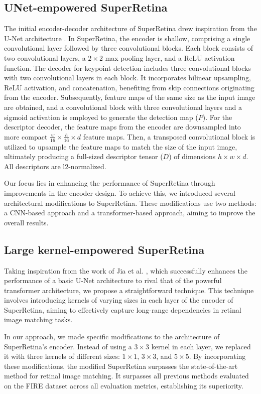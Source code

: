 \documentclass[10pt,twocolumn,letterpaper]{article}
\begin{document}
\subsection{UNet-empowered SuperRetina}
The initial encoder-decoder architecture of SuperRetina drew inspiration from the U-Net architecture \cite{ronneberger2015u}. In SuperRetina, the encoder is shallow, comprising a single convolutional layer followed by three convolutional blocks. Each block consists of two convolutional layers, a $2 \times 2$ max pooling layer, and a ReLU activation function. The decoder for keypoint detection includes three convolutional blocks with two convolutional layers in each block. It incorporates bilinear upsampling, ReLU activation, and concatenation, benefiting from skip connections originating from the encoder. Subsequently, feature maps of the same size as the input image are obtained, and a convolutional block with three convolutional layers and a sigmoid activation is employed to generate the detection map ($P$). 
For the descriptor decoder, the feature maps from the encoder are downsampled into more compact $\frac{w}{16} \times \frac{h}{16} \times d$ feature maps. Then, a transposed convolutional block is utilized to upsample the feature maps to match the size of the input image, ultimately producing a full-sized descriptor tensor ($D$) of dimensions $h \times w \times d$. All descriptors are l2-normalized.

Our focus lies in enhancing the performance of SuperRetina through improvements in the encoder design. To achieve this, we introduced several architectural modifications to SuperRetina. These modifications use two methods: a CNN-based approach and a transformer-based approach, aiming to improve the overall results.

\subsection{Large kernel-empowered SuperRetina}
Taking inspiration from the work of Jia et al. \cite{jia2022u}, which successfully enhances the performance of a basic U-Net architecture to rival that of the powerful transformer architecture, we propose a straightforward technique. This technique involves introducing kernels of varying sizes in each layer of the encoder of SuperRetina, aiming to effectively capture long-range dependencies in retinal image matching tasks.

In our approach, we made specific modifications to the architecture of SuperRetina's encoder. Instead of using a $3 \times 3$ kernel in each layer, we replaced it with three kernels of different sizes: $1 \times 1$, $3 \times 3$, and $5 \times 5$. By incorporating these modifications, the modified SuperRetina surpasses the state-of-the-art method for retinal image matching. It surpasses all previous methods evaluated on the FIRE dataset across all evaluation metrics, establishing its superiority.
\end{document}
